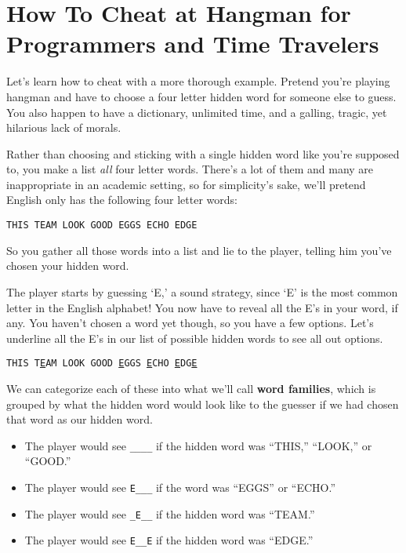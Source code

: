 \documentclass[10pt,letterpaper]{article}
\begin{document}
\section{How To Cheat at Hangman for Programmers and Time Travelers}

Let's learn how to cheat with a more thorough example.
Pretend you're playing hangman and have to choose a four letter hidden word for someone else to guess.
You also happen to have a dictionary, unlimited time, and a galling, tragic, yet hilarious lack of morals.

Rather than choosing and sticking with a single hidden word like you're supposed to, you make a list \textit{all} four letter words.
There's a lot of them and many are inappropriate in an academic setting, so for simplicity's sake, we'll pretend English only has the following four letter words:


\begin{center}
	\texttt{THIS TEAM LOOK GOOD EGGS ECHO EDGE}
\end{center}

So you gather all those words into a list and lie to the player, telling him you've chosen your hidden word.

The player starts by guessing `E,' a sound strategy, since `E' is the most common letter in the English alphabet!
You now have to reveal all the E's in your word, if any.
You haven't chosen a word yet though, so you have a few options.
Let's underline all the E's in our list of possible hidden words to see all out options.

\begin{center}
	\texttt{THIS T\underline{E}AM LOOK GOOD \underline{E}GGS \underline{E}CHO \underline{E}DG\underline{E} }
\end{center}

We can categorize each of these into what we'll call \textbf{word families}, which is grouped by what the hidden word would look like to the guesser if we had chosen that word as our hidden word.

\begin{itemize}
	\item The player would see \texttt{\_\_\_\_} if the hidden word was ``THIS,'' ``LOOK,''  or ``GOOD.''
	\item The player would see \texttt{E\_\_\_} if the word was ``EGGS'' or ``ECHO.'' 
	\item The player would see \texttt{\_E\_\_} if the hidden word was ``TEAM.''
	\item The player would see \texttt{E\_\_E} if the hidden word was ``EDGE.''
\end{itemize}
\end{document}
